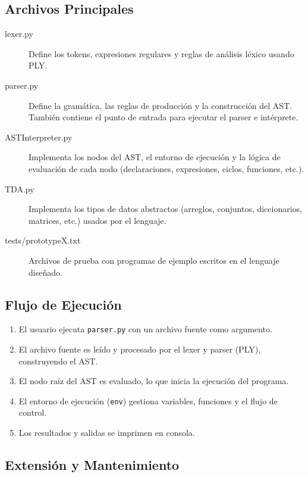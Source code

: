 \documentclass{article}
\begin{document}
\subsection{Archivos Principales}

\begin{description}
    \item[lexer.py] Define los tokens, expresiones regulares y reglas de análisis léxico usando PLY.
    \item[parser.py] Define la gramática, las reglas de producción y la construcción del AST. También contiene el punto de entrada para ejecutar el parser e intérprete.
    \item[ASTInterpreter.py] Implementa los nodos del AST, el entorno de ejecución y la lógica de evaluación de cada nodo (declaraciones, expresiones, ciclos, funciones, etc.).
    \item[TDA.py] Implementa los tipos de datos abstractos (arreglos, conjuntos, diccionarios, matrices, etc.) usados por el lenguaje.
    \item[tests/prototypeX.txt] Archivos de prueba con programas de ejemplo escritos en el lenguaje diseñado.
\end{description}

\subsection{Flujo de Ejecución}

\begin{enumerate}
    \item El usuario ejecuta \texttt{parser.py} con un archivo fuente como argumento.
    \item El archivo fuente es leído y procesado por el lexer y parser (PLY), construyendo el AST.
    \item El nodo raíz del AST es evaluado, lo que inicia la ejecución del programa.
    \item El entorno de ejecución (\texttt{env}) gestiona variables, funciones y el flujo de control.
    \item Los resultados y salidas se imprimen en consola.
\end{enumerate}

\subsection{Extensión y Mantenimiento}
\end{document}
